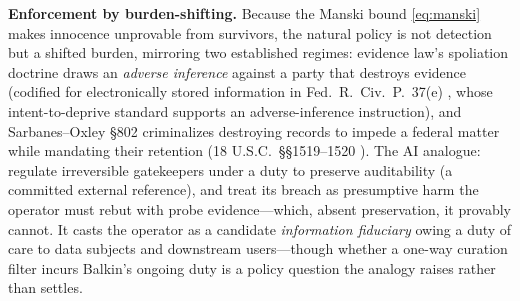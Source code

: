 \documentclass[conference]{IEEEtran}
\begin{document}
\textbf{Enforcement by burden-shifting.} Because the Manski bound \eqref{eq:manski} makes innocence unprovable from
survivors, the natural policy is not detection but a shifted burden, mirroring two established regimes: evidence
law's spoliation doctrine draws an \emph{adverse inference} against a party that destroys evidence (codified
for electronically stored information in Fed.~R.~Civ.~P.~37(e) \cite{frcp37e}, whose intent-to-deprive standard
supports an adverse-inference instruction), and
Sarbanes--Oxley \S802 criminalizes destroying records to impede a federal matter while mandating their
retention (18 U.S.C.~\S\S1519--1520 \cite{sox802}). The AI
analogue: regulate irreversible gatekeepers under a duty to preserve auditability (a committed external
reference), and treat its breach as presumptive harm the operator must rebut with probe evidence---which, absent
preservation, it provably cannot. It casts the operator as a candidate \emph{information fiduciary} \cite{balkin2016} owing a duty of care to data
subjects and downstream users---though whether a one-way curation filter incurs Balkin's ongoing duty is a policy
question the analogy raises rather than settles.
\end{document}
